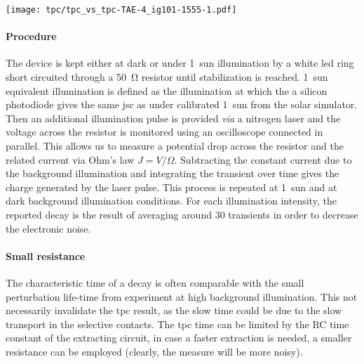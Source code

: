 \begin{SCfigure}
	\centering
	\texttt{[image: tpc/tpc\_vs\_tpc-TAE-4\_ig101-1555-1.pdf]}
	\label{fig:tpc}
\end{SCfigure}

	\paragraph{Procedure}
	The device is kept either at dark or under 1~sun illumination by a white \gls{led} ring short circuited through a \SI{50}{\ohm} resistor until stabilization is reached.
	1~sun equivalent illumination is defined as the illumination at which the a silicon photodiode gives the same \gls{jsc} as under calibrated 1~sun from the solar simulator.
	Then an additional illumination pulse is provided \textit{via} a nitrogen laser and the voltage across the resistor is monitored using an oscilloscope connected in parallel.
	This allows us to measure a potential drop across the resistor and the related current via Ohm's law $J = V / \Omega$.
	Subtracting the constant current due to the background illumination and integrating the transient over time gives the charge generated by the laser pulse.
	This process is repeated at 1~sun and at dark background illumination conditions.
	For each illumination intensity, the reported decay is the result of averaging around 30 transients in order to decrease the electronic noise.

\paragraph{Small resistance}
The characteristic time of a  decay is often comparable with the small perturbation life-time from  experiment at high background illumination.
This not necessarily invalidate the \gls{tpc} result, as the slow time could be due to the slow transport in the selective contacts.
The \gls{tpc} time can be limited by the RC time constant of the extracting circuit, in case a faster extraction is needed, a smaller resistance can be employed (clearly, the measure will be more noisy).

